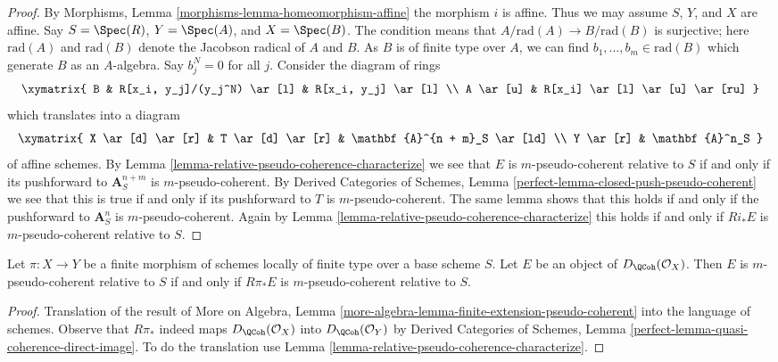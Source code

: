 \begin{proof}
By Morphisms, Lemma \ref{morphisms-lemma-homeomorphism-affine}
the morphism $i$ is affine. Thus we may assume $S$, $Y$, and $X$ are affine.
Say $S = \Spec(R)$, $Y = \Spec(A)$, and $X = \Spec(B)$.
The condition means that $A/\text{rad}(A) \to B/\text{rad}(B)$ is
surjective; here $\text{rad}(A)$ and $\text{rad}(B)$ denote
the Jacobson radical of $A$ and $B$.
As $B$ is of finite type over $A$, we can find
$b_1, \ldots, b_m \in \text{rad}(B)$ which generate $B$ as an
$A$-algebra. Say $b_j^N = 0$ for all $j$. Consider the diagram of
rings
$$
\xymatrix{
B & R[x_i, y_j]/(y_j^N) \ar[l] & R[x_i, y_j] \ar[l] \\
A \ar[u] & R[x_i] \ar[l] \ar[u] \ar[ru]
}
$$
which translates into a diagram
$$
\xymatrix{
X \ar[d] \ar[r] & T \ar[d] \ar[r] & \mathbf{A}^{n + m}_S \ar[ld] \\
Y \ar[r] & \mathbf{A}^n_S
}
$$
of affine schemes. By Lemma \ref{lemma-relative-pseudo-coherence-characterize}
we see that $E$ is $m$-pseudo-coherent relative to $S$ if and only if its
pushforward to $\mathbf{A}^{n + m}_S$ is $m$-pseudo-coherent. 
By Derived Categories of Schemes, Lemma
\ref{perfect-lemma-closed-push-pseudo-coherent}
we see that this is true if and only if its pushforward to $T$ is
$m$-pseudo-coherent. The same lemma shows that this holds if and only
if the pushforward to $\mathbf{A}^n_S$ is $m$-pseudo-coherent.
Again by
Lemma \ref{lemma-relative-pseudo-coherence-characterize}
this holds if and only if $Ri_*E$ is $m$-pseudo-coherent relative to $S$.
\end{proof}

\begin{lemma}
\label{lemma-finite-morphism-relative-pseudo-coherence}
Let $\pi : X \to Y$ be a finite morphism of schemes locally of finite
type over a base scheme $S$. Let $E$ be an object of
$D_\QCoh(\mathcal{O}_X)$. Then $E$ is $m$-pseudo-coherent
relative to $S$ if and only if $R\pi_*E$ is $m$-pseudo-coherent
relative to $S$.
\end{lemma}

\begin{proof}
Translation of the result of
More on Algebra, Lemma
\ref{more-algebra-lemma-finite-extension-pseudo-coherent}
into the language of schemes. Observe that $R\pi_*$ indeed
maps $D_\QCoh(\mathcal{O}_X)$ into $D_\QCoh(\mathcal{O}_Y)$
by Derived Categories of Schemes, Lemma
\ref{perfect-lemma-quasi-coherence-direct-image}.
To do the translation use
Lemma \ref{lemma-relative-pseudo-coherence-characterize}.
\end{proof}

